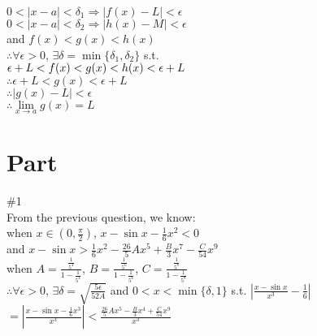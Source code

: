 \documentclass{article}
\begin{document}
$0<|x-a|<\delta_1 \Rightarrow |f(x)-L|<\epsilon$\\

$0<|x-a|<\delta_2 \Rightarrow |h(x)-M|<\epsilon$\\

and $f(x)<g(x)<h(x)$\\

$\therefore$\qquad$\forall\epsilon>0$, $\exists\delta=\min\{\delta_1,\delta_2\}$ s.t.\\

\qquad\quad$\-\epsilon+L<f(x)<g(x)<h(x)<\epsilon+L$\\

$\therefore$\qquad$\epsilon+L<g(x)<\epsilon+L$\\

$\therefore$\qquad$|g(x)-L|<\epsilon$\\

$\therefore$\qquad$\lim \limits_{x \to a}g(x)=L$\\

\section{\textcolor[rgb]{0.70,0.00,0.00}{Part \uppercase\expandafter{}}}

\vspace{3.5mm}

\textcolor[rgb]{0.00,0.00,0.50}{\#1}\\

From the previous question, we know:\\

when $x\in(0,\displaystyle\frac{\pi}{2})$, $x-\sin{x}-\displaystyle\frac{1}{6}x^2<0$\\

and $x-\sin{x}>\displaystyle\frac{1}{6}x^2-\frac{26}{5}Ax^5+\frac{B}{3}x^7-\frac{C}{54}x^9$\\

when $A=\displaystyle\frac{\frac{1}{5^4}}{1-\frac{1}{5^4}}$, $B=\displaystyle\frac{\frac{1}{5^6}}{1-\frac{1}{5^6}}$, $C=\displaystyle\frac{\frac{1}{5^8}}{1-\frac{1}{5^8}}$\\

$\therefore$\qquad$\forall\epsilon>0$, $\exists\delta=\sqrt{\displaystyle\frac{5\epsilon}{52A}}$ and $0<x<\min\{\delta,1\}$ s.t.
$\displaystyle\left|\frac{x-\sin{x}}{x^3}-\frac{1}{6}\right|$\\

\qquad\quad\quad\qquad\quad$=\left|\frac{x-\sin{x}-\frac{1}{6}x^3}{x^3}\right|<\frac{\frac{26}{5}Ax^5-\frac{B}{3}x^4+\frac{C}{54}x^9}{x^3}$\\
\end{document}
